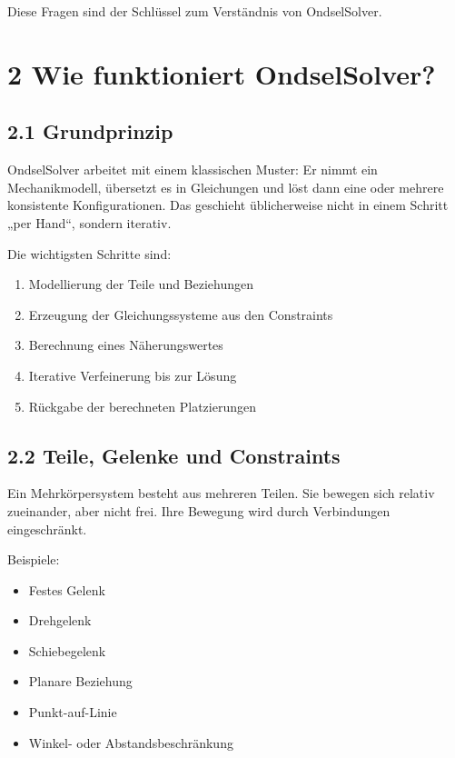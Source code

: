\documentclass[
  12pt
]{book}
\providecommand{\tightlist}{%
  \setlength{\itemsep}{0pt}\setlength{\parskip}{0pt}}
\begin{document}
Diese Fragen sind der Schlüssel zum Verständnis von OndselSolver.

\hypertarget{kap-wie-funktioniert-ondselsolver}{%
\chapter{\texorpdfstring{{2} Wie funktioniert
OndselSolver?}{2 Wie funktioniert OndselSolver?}}\label{kap-wie-funktioniert-ondselsolver}}

\hypertarget{grundprinzip}{%
\section{\texorpdfstring{{2.1}
Grundprinzip}{2.1 Grundprinzip}}\label{grundprinzip}}

OndselSolver arbeitet mit einem klassischen Muster: Er nimmt ein
Mechanikmodell, übersetzt es in Gleichungen und löst dann eine oder
mehrere konsistente Konfigurationen. Das geschieht üblicherweise nicht
in einem Schritt „per Hand``, sondern iterativ.

Die wichtigsten Schritte sind:

\begin{enumerate}
\def\labelenumi{\arabic{enumi}.}
\tightlist
\item
  Modellierung der Teile und Beziehungen
\item
  Erzeugung der Gleichungssysteme aus den Constraints
\item
  Berechnung eines Näherungswertes
\item
  Iterative Verfeinerung bis zur Lösung
\item
  Rückgabe der berechneten Platzierungen
\end{enumerate}

\hypertarget{teile-gelenke-und-constraints}{%
\section{\texorpdfstring{{2.2} Teile, Gelenke und
Constraints}{2.2 Teile, Gelenke und Constraints}}\label{teile-gelenke-und-constraints}}

Ein Mehrkörpersystem besteht aus mehreren Teilen. Sie bewegen sich
relativ zueinander, aber nicht frei. Ihre Bewegung wird durch
Verbindungen eingeschränkt.

Beispiele:

\begin{itemize}
\tightlist
\item
  Festes Gelenk
\item
  Drehgelenk
\item
  Schiebegelenk
\item
  Planare Beziehung
\item
  Punkt-auf-Linie
\item
  Winkel- oder Abstandsbeschränkung
\end{itemize}
\end{document}
